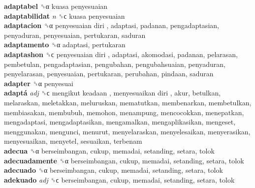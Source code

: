 \textbf{adaptabel} ␝α   kuasa penyesuaian   \\
\textbf{adaptabilidat} \emph{n}  ␝ϲ   kuasa penyesuaian   \\
\textbf{adaptacion} ␝α   penyesuaian diri , adaptasi, padanan, pengadaptasian, penyaduran, penyesuaian, pertukaran, saduran  \\
\textbf{adaptamento} ␝α  adaptasi, pertukaran  \\
\textbf{adaptashon} ␝ϲ   penyesuaian diri , adaptasi, akomodasi, padanan, pelarasan, pembetulan, pengadaptasian, pengubahan, pengubahsuaian, penyaduran, penyelarasan, penyesuaian, pertukaran, perubahan, pindaan, saduran  \\
\textbf{adapter} ␝α  penyesuai  \\
\textbf{adaptá} \emph{adj}  ␝ϲ   mengikut keadaan ,  menyesuaikan diri , akur, betulkan, melaraskan, meletakkan, meluruskan, mematutkan, membenarkan, membetulkan, membiasakan, membubuh, memohon, menampung, mencocokkan, menepatkan, mengadaptasi, mengadaptasikan, mengamalkan, mengaplikasikan, mengeset, menggunakan, mengunci, menurut, menyelaraskan, menyelesaikan, menyerasikan, menyesuaikan, menyetel, sesuaikan, terbenam  \\
\textbf{adecua} ␝α  berseimbangan, cukup, memadai, setanding, setara, tolok  \\
\textbf{adecuadamente} ␝α  berseimbangan, cukup, memadai, setanding, setara, tolok  \\
\textbf{adecuado} ␝α  berseimbangan, cukup, memadai, setanding, setara, tolok  \\
\textbf{adekuado} \emph{adj}  ␝ϲ  berseimbangan, cukup, memadai, setanding, setara, tolok  \\
